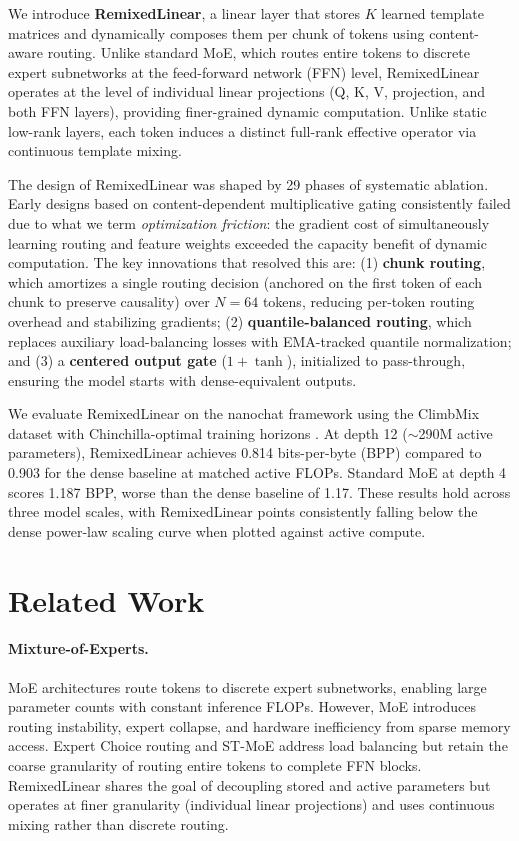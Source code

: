 \documentclass[11pt]{article}
\begin{document}
We introduce \textbf{RemixedLinear}, a linear layer that stores $K$ learned template matrices and dynamically composes them per chunk of tokens using content-aware routing. Unlike standard MoE, which routes entire tokens to discrete expert subnetworks at the feed-forward network (FFN) level, RemixedLinear operates at the level of individual linear projections (Q, K, V, projection, and both FFN layers), providing finer-grained dynamic computation. Unlike static low-rank layers, each token induces a distinct full-rank effective operator via continuous template mixing.

The design of RemixedLinear was shaped by 29 phases of systematic ablation. Early designs based on content-dependent multiplicative gating consistently failed due to what we term \emph{optimization friction}: the gradient cost of simultaneously learning routing and feature weights exceeded the capacity benefit of dynamic computation. The key innovations that resolved this are: (1) \textbf{chunk routing}, which amortizes a single routing decision (anchored on the first token of each chunk to preserve causality) over $N{=}64$ tokens, reducing per-token routing overhead and stabilizing gradients; (2) \textbf{quantile-balanced routing}, which replaces auxiliary load-balancing losses with EMA-tracked quantile normalization; and (3) a \textbf{centered output gate} ($1 + \tanh$), initialized to pass-through, ensuring the model starts with dense-equivalent outputs.

We evaluate RemixedLinear on the nanochat framework \citep{karpathy2025nanochat} using the ClimbMix dataset with Chinchilla-optimal training horizons \citep{hoffmann2022training}. At depth 12 ($\sim$290M active parameters), RemixedLinear achieves 0.814 bits-per-byte (BPP) compared to 0.903 for the dense baseline at matched active FLOPs. Standard MoE at depth 4 scores 1.187 BPP, worse than the dense baseline of 1.17. These results hold across three model scales, with RemixedLinear points consistently falling below the dense power-law scaling curve when plotted against active compute.

\section{Related Work}

\paragraph{Mixture-of-Experts.}
MoE architectures \citep{shazeer2017outrageously, lepikhin2020gshard, fedus2022switch} route tokens to discrete expert subnetworks, enabling large parameter counts with constant inference FLOPs. However, MoE introduces routing instability, expert collapse, and hardware inefficiency from sparse memory access. Expert Choice routing \citep{zhou2022expertchoice} and ST-MoE \citep{zoph2022stmoe} address load balancing but retain the coarse granularity of routing entire tokens to complete FFN blocks. RemixedLinear shares the goal of decoupling stored and active parameters but operates at finer granularity (individual linear projections) and uses continuous mixing rather than discrete routing.
\end{document}
